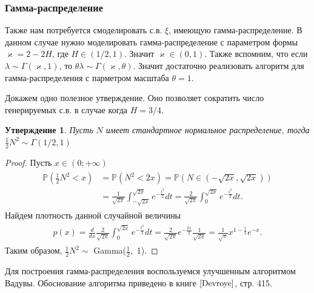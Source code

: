\documentclass[a4paper,12pt]{article}
\numberwithin{equation}{section}
\newtheorem{Proposition}{Утверждение}
\newtheorem{proof}{Доказательство}
\begin{document}
	\subsubsection{Гамма-распределение}
	
	Также нам потребуется смоделировать с.в. $\xi$, имеющую гамма-распределение. В данном случае нужно моделировать гамма-распределение с параметром формы $\varkappa =2-2H$, где $H \in (1/2,1)$. Значит $\varkappa \in (0,1)$. Также вспомним, что если $\lambda \sim \Gamma(\varkappa, 1)$, то $\theta \lambda \sim \Gamma(\varkappa, \theta)$. Значит достаточно реализовать алгоритм для гамма-распределения с парметром масштаба $\theta = 1$.     
	
	Докажем одно полезное утверждение. Оно позволяет сократить число генерируемых с.в. в случае когда $H = 3/4$. 
	\begin{Proposition}\label{3}
		Пусть $N$  имеет стандартное нормальное распределение, тогда  $\frac{1}{2}N^2 \sim \Gamma(1/2, 1)$
	\end{Proposition}
	\begin{proof}
		Пусть $x\in (0;+\infty)$
		\begin{align}
		\begin{split}
		\mathbb{P}(\frac{1}{2}N^2<x) &= \mathbb{P}(N^2<2x) = \mathbb{P}(N \in (-\sqrt{2x},\sqrt{2x}))\\ &=\frac{1}{\sqrt{2\pi}} \int_{-\sqrt{2x}}^{\sqrt{2x}}e^{-\frac{t^2}{2}}dt = \frac{2}{\sqrt{2\pi}}\int_{0}^{\sqrt{2x}}e^{-\frac{t^2}{2}}dt. 
		\end{split}
		\end{align} 
		Найдем плотность данной случайной величины
		\begin{align}
		\begin{split}
		p(x) = \frac{d}{dx}  \frac{2}{\sqrt{2\pi}}\int_{0}^{\sqrt{2x}}e^{-\frac{t^2}{2}}dt = \frac{2}{\sqrt{2\pi}}e^{-\frac{2x}{2}}\frac{1}{\sqrt{2x}} = \frac{1}{\sqrt{\pi}}x^{1-\frac{1}{2}}e^{-x}.
		\end{split}
		\end{align}
		Таким образом,  $\frac{1}{2}N^2 \sim $ Gamma($\frac{1}{2},$ 1).
	\end{proof} 
	
	Для построения гамма-распределения воспользуемся улучшенным алгоритмом Вадувы. Обоснование алгоритма приведено в книге $\cite{Devroye}$, стр. 415.  
	
\end{document}
